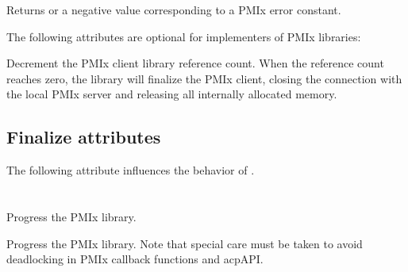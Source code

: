 \begin{arglist}
\end{arglist}

Returns  or a negative value corresponding to a PMIx error constant.

\optattrstart
The following attributes are optional for implementers of \ac{PMIx} libraries:

\optattrend

\descr

Decrement the \ac{PMIx} client library reference count.
When the reference count reaches zero, the library will finalize the \ac{PMIx} client, closing the connection with the local \ac{PMIx} server and releasing all internally allocated memory.

\subsection{Finalize attributes}

The following attribute influences the behavior of .

%


\section{}

\summary

Progress the \ac{PMIx} library.

\format



\descr

Progress the \ac{PMIx} library. Note that special care must be taken to avoid deadlocking in \ac{PMIx} callback functions and acp{API}.


